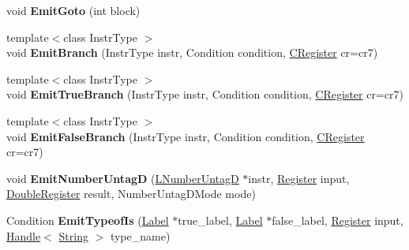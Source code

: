 \begin{DoxyCompactItemize}
\item 
void {\bfseries Emit\+Goto} (int block)\hypertarget{classv8_1_1internal_1_1_l_code_gen_a77ef06fc94dce505c88f628d129c114d}{}\label{classv8_1_1internal_1_1_l_code_gen_a77ef06fc94dce505c88f628d129c114d}

\item 
{\footnotesize template$<$class Instr\+Type $>$ }\\void {\bfseries Emit\+Branch} (Instr\+Type instr, Condition condition, \hyperlink{structv8_1_1internal_1_1_c_register}{C\+Register} cr=cr7)\hypertarget{classv8_1_1internal_1_1_l_code_gen_ab66d947dee4450f3e09acf0948f06c3a}{}\label{classv8_1_1internal_1_1_l_code_gen_ab66d947dee4450f3e09acf0948f06c3a}

\item 
{\footnotesize template$<$class Instr\+Type $>$ }\\void {\bfseries Emit\+True\+Branch} (Instr\+Type instr, Condition condition, \hyperlink{structv8_1_1internal_1_1_c_register}{C\+Register} cr=cr7)\hypertarget{classv8_1_1internal_1_1_l_code_gen_ae139064800a02e0b82681132d30ef04a}{}\label{classv8_1_1internal_1_1_l_code_gen_ae139064800a02e0b82681132d30ef04a}

\item 
{\footnotesize template$<$class Instr\+Type $>$ }\\void {\bfseries Emit\+False\+Branch} (Instr\+Type instr, Condition condition, \hyperlink{structv8_1_1internal_1_1_c_register}{C\+Register} cr=cr7)\hypertarget{classv8_1_1internal_1_1_l_code_gen_aa8611bf8797a7df9377bf5026374970d}{}\label{classv8_1_1internal_1_1_l_code_gen_aa8611bf8797a7df9377bf5026374970d}

\item 
void {\bfseries Emit\+Number\+UntagD} (\hyperlink{classv8_1_1internal_1_1_l_number_untag_d}{L\+Number\+UntagD} $\ast$instr, \hyperlink{structv8_1_1internal_1_1_register}{Register} input, \hyperlink{structv8_1_1internal_1_1_double_register}{Double\+Register} result, Number\+Untag\+D\+Mode mode)\hypertarget{classv8_1_1internal_1_1_l_code_gen_afe9da04662b57d40a181108571021c8c}{}\label{classv8_1_1internal_1_1_l_code_gen_afe9da04662b57d40a181108571021c8c}

\item 
Condition {\bfseries Emit\+Typeof\+Is} (\hyperlink{classv8_1_1internal_1_1_label}{Label} $\ast$true\+\_\+label, \hyperlink{classv8_1_1internal_1_1_label}{Label} $\ast$false\+\_\+label, \hyperlink{structv8_1_1internal_1_1_register}{Register} input, \hyperlink{classv8_1_1internal_1_1_handle}{Handle}$<$ \hyperlink{classv8_1_1internal_1_1_string}{String} $>$ type\+\_\+name)\hypertarget{classv8_1_1internal_1_1_l_code_gen_a5a55e449dc173cc3d5f458623d904e34}{}\label{classv8_1_1internal_1_1_l_code_gen_a5a55e449dc173cc3d5f458623d904e34}


\end{DoxyCompactItemize}
